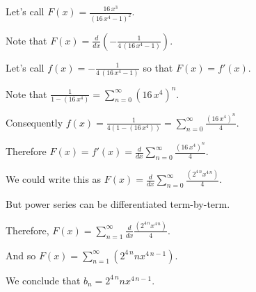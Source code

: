 \documentclass{ximera}
\begin{document}
\begin{question}
  \begin{solution}
    \begin{hint}
      Let's call \(F(x) = \displaystyle\frac{16 \, x^{3} }{ {\left(16 \, x^{4} - 1\right)}^{2} }\).
    \end{hint}
    \begin{hint}
      Note that \(F(x) = \displaystyle\frac{d}{dx} \left( -\displaystyle\frac{1}{4 \, {\left(16 \, x^{4} - 1\right)} } \right)\).
    \end{hint}
    \begin{hint}
      Let's call \(f(x) = -\displaystyle\frac{1}{4 \, {\left(16 \, x^{4} - 1\right)} }\) so that \(F(x) = f'(x)\).
    \end{hint}
    \begin{hint}
      Note that \(\displaystyle\frac{1}{1 - \left(16 \, x^{4}\right)} = \displaystyle\sum_{n=0}^\infty \left( 16 \, x^{4} \right)^n \).
    \end{hint}
    \begin{hint}
      Consequently \(f(x) = \displaystyle\frac{1}{4 \left( 1 - \left(16 \, x^{4}\right)\right)} = \displaystyle\sum_{n=0}^\infty \displaystyle\frac{\left( 16 \, x^{4} \right)^n}{4} \).
    \end{hint}
    \begin{hint}
      Therefore \(F(x) = f'(x) = \displaystyle\frac{d}{dx} \displaystyle\sum_{n=0}^\infty \displaystyle\frac{\left( 16 \, x^{4} \right)^n}{4} \).
    \end{hint}
    \begin{hint}
      We could write this as \(F(x) = \displaystyle\frac{d}{dx} \displaystyle\sum_{n=0}^\infty \displaystyle\frac{\left( 2^{4 \, n} x^{4 \, n} \right)}{4} \).
    \end{hint}
    \begin{hint}
      But power series can be differentiated term-by-term.
    \end{hint}
    \begin{hint}
      Therefore, \(F(x) = \displaystyle\sum_{n=1}^\infty \displaystyle\frac{d}{dx} \displaystyle\frac{\left( 2^{4 \, n} x^{4 \, n} \right)}{4} \).
    \end{hint}
    \begin{hint}
      And so \(F(x) = \displaystyle\sum_{n=1}^\infty \left( 2^{4 \, n} n x^{4 \, n - 1} \right) \).
    \end{hint}
    \begin{hint}
      We conclude that \(b_n = 2^{4 \, n} n x^{4 \, n - 1} \).
    \end{hint}


    \begin{multiple-choice}
    \end{multiple-choice}

  \end{solution}
\end{question}
\end{document}
